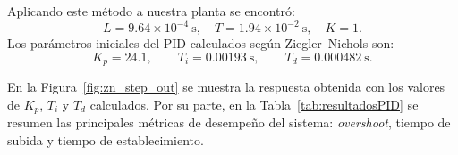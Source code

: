 Aplicando este método a nuestra planta se encontró:
\[
L = 9.64 \times 10^{-4}~\text{s}, \quad T = 1.94\times 10^{-2}~\text{s}, \quad K=1.
\]
Los parámetros iniciales del PID calculados según Ziegler--Nichols son:
\[
K_p = 24.1, \qquad T_i = 0.00193~\text{s}, \qquad T_d = 0.000482~\text{s}.
\]

En la Figura~\ref{fig:zn_step_out} se muestra la respuesta obtenida con los valores de $K_p$, $T_i$ y $T_d$ calculados. 
Por su parte, en la Tabla~\ref{tab:resultadosPID} se resumen las principales métricas de desempeño del sistema: \emph{overshoot}, tiempo de subida y tiempo de establecimiento.

